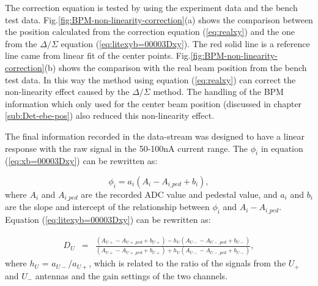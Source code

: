 \documentclass[english,review,number,sort&compress]{elsarticle}
\begin{document}
The correction equation is tested by using the experiment data and the bench test data. Fig.\ref{fig:BPM-non-linearity-correction}(a) shows the comparison between the position calculated from the correction equation (\ref{eq:realxy}) and the one from the $\Delta/\Sigma$ equation (\ref{eq:litexyb=00003Dxy}). The red solid line is a reference line came from linear fit of the center points. Fig.\ref{fig:BPM-non-linearity-correction}(b) shows the comparison with the real beam position from the bench test data. In this way the method using equation (\ref{eq:realxy}) can correct the non-linearity effect caused by the $\Delta/\Sigma$ method. The handling of the BPM information which only used for the center beam position (discussed in chapter \ref{sub:Det-ebe-pos}) also reduced this non-linearity effect. 

The final information recorded in the data-stream was designed to have a linear response with the raw signal in the 50-100nA current range. The $\phi_{i}$ in equation (\ref{eq:xb=00003Dxy}) can be rewritten as:

\begin{equation}
\phi_{i}=a_{i}(A_{i}-A_{i\_ped}+b_{i}),\label{eq:phivsA}
\end{equation}
where $A_{i}$ and $A_{i\_ped}$ are the recorded ADC value and pedestal value, and $a_{i}$ and $b_{i}$ are the slope and intercept of the relationship between $\phi_{i}$ and $A_{i}-A_{i\_ped}$. Equation (\ref{eq:litexyb=00003Dxy}) can be rewritten as:

\begin{eqnarray}
D_{U} & = & \frac{(A_{U+}-A_{U+\_ped}+b_{U+})-h_{U}(A_{U-}-A_{U-\_ped}+b_{U-})}{(A_{U+}-A_{U+\_ped}+b_{U+})+h_{U}(A_{U-}-A_{U-\_ped}+b_{U-})},\label{eq:xbfab}
\end{eqnarray}
where $h_{U}$ = $a_{U-}/a_{U+}$, which is related to the ratio of the signals from the $U_{+}$ and $U_{-}$ antennas and the gain settings of the two channels. 
\end{document}
